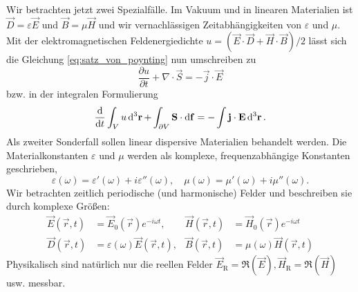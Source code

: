 Wir betrachten jetzt zwei Spezialfälle. Im Vakuum und in linearen Materialien ist $\vec {D}=\varepsilon \vec {E}$ und $\vec {B}=\mu \vec {H}$ und wir vernachlässigen Zeitabhängigkeiten von $\varepsilon $ und $\mu $. Mit der elektromagnetischen Feldenergiedichte $u=\left(\vec {E}\cdot \vec {D}+\vec {H}\cdot \vec {B}\right)/2$ lässt sich die Gleichung \eqref{eq:satz_von_poynting} nun umschreiben zu
\begin{equation*}
	\frac{\partial u}{\partial t}+\nabla \cdot \vec {S}=-\vec {j}\cdot \vec {E}
\end{equation*}
bzw. in der integralen Formulierung
\begin{equation*}
	\frac{\diff }{\diff t}\int _{V}u\diffa[3]{\vec{r}}+\int _{\partial V}\vec {S}\cdot \diff \vec {f}=-\int \vec {j}\cdot \vec {E}\diffa[3]{\vec{r}}.
\end{equation*}
Als zweiter Sonderfall sollen linear dispersive Materialien behandelt werden. Die Materialkonstanten $\varepsilon $ und $\mu $ werden als komplexe, frequenzabhängige Konstanten geschrieben,
\begin{equation*}
	\varepsilon \left(\omega \right)=\varepsilon '\left(\omega \right)+i\varepsilon ''\left(\omega \right),\quad \mu \left(\omega \right)=\mu '\left(\omega \right)+i\mu ''\left(\omega \right).
\end{equation*}
Wir betrachten zeitlich periodische (und harmonische) Felder und beschreiben sie durch komplexe Größen:
\begin{align*}
	\vec {E}\left(\vec {r},t\right) & =\vec {E}_{0}\left(\vec {r}\right)e^{-i\omega t},                 & \vec {H}\left(\vec {r},t\right) & =\vec {H}_{0}\left(\vec {r}\right)e^{-i\omega t}         \\
	\vec {D}\left(\vec {r},t\right) & =\varepsilon \left(\omega \right)\vec {E}\left(\vec {r},t\right), & \vec {B}\left(\vec {r},t\right) & =\mu \left(\omega \right)\vec {H}\left(\vec {r},t\right)
\end{align*}
Physikalisch sind natürlich nur die reellen Felder $\vec {E}_{\mathrm{R}}=\mathfrak{R}\left(\vec {E}\right), \vec {H}_{\mathrm{R}}=\mathfrak{R}\left(\vec {H}\right)$ usw. messbar.

